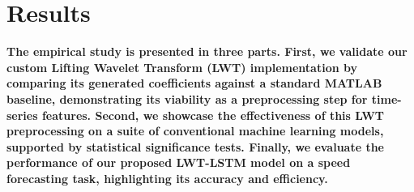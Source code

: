 \documentclass[journal]{IEEEtran}
\begin{document}
%



\section{Results}

\textbf{The empirical study is presented in three parts. First, we validate our custom Lifting Wavelet Transform (LWT) implementation by comparing its generated coefficients against a standard MATLAB baseline, demonstrating its viability as a preprocessing step for time-series features. Second, we showcase the effectiveness of this LWT preprocessing on a suite of conventional machine learning models, supported by statistical significance tests. Finally, we evaluate the performance of our proposed LWT-LSTM model on a speed forecasting task, highlighting its accuracy and efficiency.}
\end{document}
